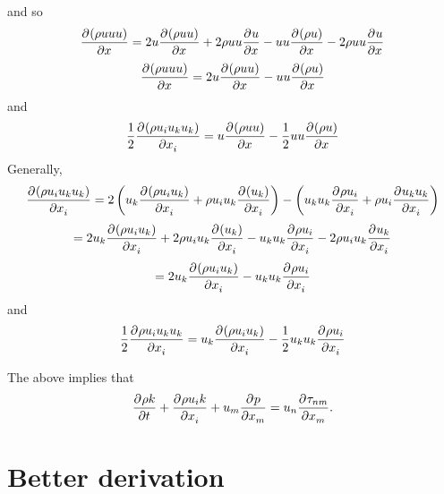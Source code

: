 \documentclass[12pt]{article}
\numberwithin{equation}{section}
\numberwithin{figure}{section}
\begin{document}
and so
\begin{equation}
\pdv{(\rho u u u)}{x} = 2u \pdv{(\rho u u)}{x} + 2\rho u u \pdv{u}{x} - u u \pdv{(\rho u)}{x} - 2\rho u u\pdv{u}{x}
\end{equation}
\begin{equation}
\pdv{(\rho u u u)}{x} = 2u \pdv{(\rho u u)}{x} - u u \pdv{(\rho u)}{x}
\end{equation}
and
\begin{equation}
\frac{1}{2}\pdv{(\rho u_i u_k u_k)}{x_i} = u \pdv{(\rho u u)}{x} - \frac{1}{2}u u \pdv{(\rho u)}{x}
\end{equation}
Generally,
\begin{equation}
\pdv{(\rho u_i u_k u_k)}{x_i} = 2\left(u_k\pdv{(\rho u_i u_k)}{x_i} + \rho u_i u_k\pdv{(u_k)}{x_i}\right) - \left(u_k u_k\pdv{\rho u_i}{x_i} + \rho u_i\pdv{u_k u_k}{x_i}\right)
\end{equation}
\begin{equation}
=2u_k\pdv{(\rho u_i u_k)}{x_i} + 2\rho u_i u_k\pdv{(u_k)}{x_i} - u_k u_k\pdv{\rho u_i}{x_i} - 2\rho u_i u_k\pdv{u_k }{x_i}
\end{equation}
\begin{equation}
=2u_k\pdv{(\rho u_i u_k)}{x_i} - u_k u_k\pdv{\rho u_i}{x_i}
\end{equation}
and
\begin{equation}
\frac{1}{2}\pdv{\rho u_i u_k u_k}{x_i} = u_k\pdv{(\rho u_i u_k)}{x_i} - \frac{1}{2}u_k u_k\pdv{\rho u_i}{x_i}
\end{equation}

The above implies that
\begin{equation}
\pdv{\rho k}{t} + \pdv{\rho u_i k}{x_i} + u_m\pdv{p}{x_m} = u_n\pdv{\tau_{nm}}{x_m}.
\end{equation}

\section{Better derivation}
\end{document}
